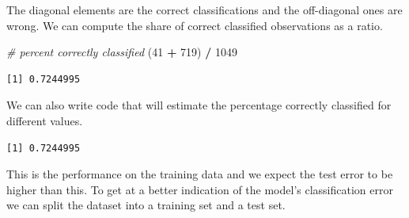 \documentclass[]{article}
\newenvironment{Shaded}{\begin{snugshade}}{\end{snugshade}}
\newcommand{\CommentTok}[1]{\textcolor[rgb]{0.56,0.35,0.01}{\textit{#1}}}
\newcommand{\DataTypeTok}[1]{\textcolor[rgb]{0.13,0.29,0.53}{#1}}
\newcommand{\DecValTok}[1]{\textcolor[rgb]{0.00,0.00,0.81}{#1}}
\newcommand{\KeywordTok}[1]{\textcolor[rgb]{0.13,0.29,0.53}{\textbf{#1}}}
\newcommand{\NormalTok}[1]{#1}
\newcommand{\OperatorTok}[1]{\textcolor[rgb]{0.81,0.36,0.00}{\textbf{#1}}}
\newcommand{\OtherTok}[1]{\textcolor[rgb]{0.56,0.35,0.01}{#1}}
\newcommand{\StringTok}[1]{\textcolor[rgb]{0.31,0.60,0.02}{#1}}
\begin{document}
The diagonal elements are the correct classifications and the off-diagonal ones are wrong. We can compute the share of correct classified observations as a ratio.

\begin{Shaded}
\begin{Highlighting}[]
\CommentTok{# percent correctly classified}
\NormalTok{(}\DecValTok{41} \OperatorTok{+}\StringTok{ }\DecValTok{719}\NormalTok{) }\OperatorTok{/}\StringTok{ }\DecValTok{1049}
\end{Highlighting}
\end{Shaded}

\begin{verbatim}
[1] 0.7244995
\end{verbatim}

We can also write code that will estimate the percentage correctly classified for different values.

\begin{Shaded}
\end{Shaded}

\begin{verbatim}
[1] 0.7244995
\end{verbatim}

This is the performance on the training data and we expect the test error to be higher than this. To get at a better indication of the model's classification error we can split the dataset into a training set and a test set.

\begin{Shaded}
\end{Shaded}
\end{document}
